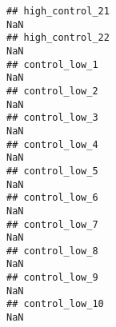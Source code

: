 \documentclass[
]{article}
\begin{document}
\begin{verbatim}
## high_control_21                                                                                                                                                                                                                 NaN
## high_control_22                                                                                                                                                                                                                 NaN
## control_low_1                                                                                                                                                                                                                   NaN
## control_low_2                                                                                                                                                                                                                   NaN
## control_low_3                                                                                                                                                                                                                   NaN
## control_low_4                                                                                                                                                                                                                   NaN
## control_low_5                                                                                                                                                                                                                   NaN
## control_low_6                                                                                                                                                                                                                   NaN
## control_low_7                                                                                                                                                                                                                   NaN
## control_low_8                                                                                                                                                                                                                   NaN
## control_low_9                                                                                                                                                                                                                   NaN
## control_low_10                                                                                                                                                                                                                  NaN

\end{verbatim}
\end{document}
